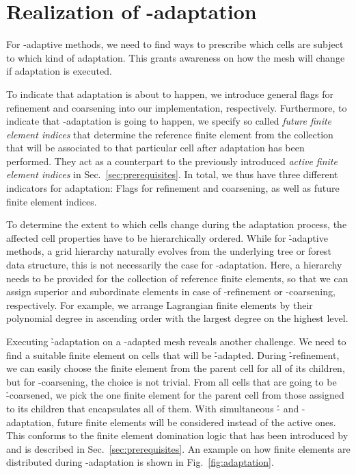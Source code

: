 \section{Realization of \hp-adaptation}
\label{sec:adaptation}

For \hp{}-adaptive methods, we need to find ways to prescribe which cells are subject to which kind of adaptation. This grants awareness on how the mesh will change if adaptation is executed.

To indicate that adaptation is about to happen, we introduce general flags for refinement and coarsening into our implementation, respectively. Furthermore, to indicate that \p-adaptation is going to happen, we specify so called \textit{future finite element indices} that determine the reference finite element from the collection that will be associated to that particular cell after adaptation has been performed. They act as a counterpart to the previously introduced \textit{active finite element indices} in Sec.~\ref{sec:prerequisites}. In total, we thus have three different indicators for adaptation: Flags for refinement and coarsening, as well as future finite element indices.

To determine the extent to which cells change during the adaptation process, the affected cell properties have to be hierarchically ordered. While for \h-adaptive methods, a grid hierarchy naturally evolves from the underlying tree or forest data structure, this is not necessarily the case for \p-adaptation. Here, a hierarchy needs to be provided for the collection of reference finite elements, so that we can assign superior and subordinate elements in case of \p-refinement or \p-coarsening, respectively. For example, we arrange Lagrangian finite elements by their polynomial degree in ascending order with the largest degree on the highest level.

Executing \h-adaptation on a \p-adapted mesh reveals another challenge. We need to find a suitable finite element on cells that will be \h-adapted. During \h-refinement, we can easily choose the finite element from the parent cell for all of its children, but for \p-coarsening, the choice is not trivial. From all cells that are going to be \h-coarsened, we pick the one finite element for the parent cell from those assigned to its children that encapsulates all of them. With simultaneous \h- and \p-adaptation, future finite elements will be considered instead of the active ones. This conforms to the finite element domination logic that has been introduced by \textcite{bangerth2009} and is described in Sec.~\ref{sec:prerequisites}. An example on how finite elements are distributed during \hp-adaptation is shown in Fig.~\ref{fig:adaptation}.

